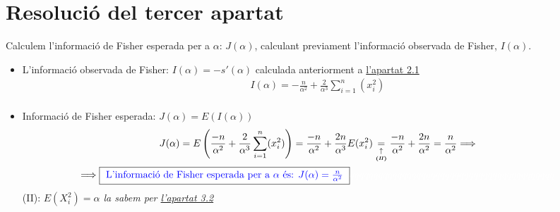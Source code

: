 \documentclass[12pt]{article}
\begin{document}
\section{Resolució del tercer apartat}
Calculem l'informació de Fisher esperada per a $\alpha$: $J(\alpha)$, calculant previament l'informació observada de Fisher, $I(\alpha)$.
\begin{itemize}
    \item L'informació observada de Fisher: $I(\alpha)=-s'(\alpha)$ calculada anteriorment a \href{score}{\textcolor{blue(ncs)}{l'apartat 2.1}}
    \begin{multline*}
        I(\alpha)= -\frac{n}{\alpha^2} + \frac{2}{\alpha^3}\sum_{i=1}^{n}(x_i^2)\\
    \end{multline*}
    \item Informació de Fisher esperada: $J(\alpha)=E(I(\alpha))$
    \begin{multline*}
        J(\alpha) = E \left(\frac{-n}{\alpha^2} + \frac{2}{\alpha^3}\sum_{i=1}^{n}(x_i^2)\right) = \frac{-n}{\alpha^2} + \frac{2n}{\alpha^3}E(x_i^2) \underset{\underset{\textbf{(\textit{II})}}{\uparrow}}{=} \frac{-n}{\alpha^2} + \frac{2n}{\alpha^2} = \frac{n}{\alpha^2} \Longrightarrow\\
        \Longrightarrow  \fcolorbox{black}{white}{ \textcolor{blue}{L'informació de Fisher esperada per a $\alpha$ és: $J(\alpha)=\frac{n}{\alpha^2}$} } \textcolor{white}{qqqqqqqqqqqqqqqqqqqqqqqqqqqqqqqqqqqqqqqqqqq}
    \end{multline*}
    (II): \textit{$E(X_i^2)=\alpha$ la sabem per \href{esperanza}{\textcolor{blue(ncs)}{l'apartat 3.2}} }\\
\end{itemize}
\newpage
\end{document}
